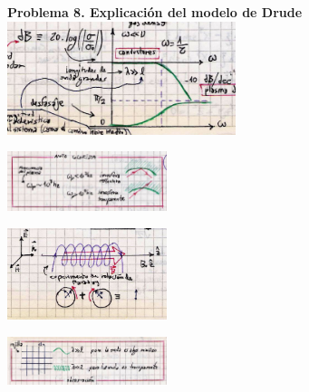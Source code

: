 \documentclass[10pt,oneside]{CBFT_book}
\begin{document}
\begin{ejemplo}{\bf Problema 8. Explicación del modelo de Drude}
\includegraphics[width=0.5\textwidth]{images/fig_ft1_problema8C.jpg} 



\includegraphics[width=0.35\textwidth]{images/fig_ft1_problema8D.jpg} 

\includegraphics[width=0.35\textwidth]{images/fig_ft1_problema8E.jpg} 

\includegraphics[width=0.35\textwidth]{images/fig_ft1_problema8F.jpg} 

 
\end{ejemplo}


\end{document}
